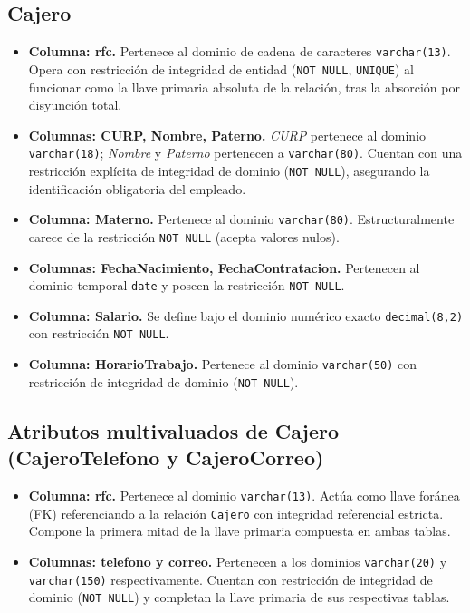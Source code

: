 \documentclass[11pt,letterpaper,spanish]{article}
\begin{document}
\subsection*{Cajero}
\begin{itemize}
	\item \textbf{Columna: rfc.} Pertenece al dominio de cadena de caracteres \texttt{varchar(13)}. Opera con restricción de integridad de entidad (\texttt{NOT NULL}, \texttt{UNIQUE}) al funcionar como la llave primaria absoluta de la relación, tras la absorción por disyunción total.
	\item \textbf{Columnas: CURP, Nombre, Paterno.} \textit{CURP} pertenece al dominio \texttt{varchar(18)}; \textit{Nombre} y \textit{Paterno} pertenecen a \texttt{varchar(80)}. Cuentan con una restricción explícita de integridad de dominio (\texttt{NOT NULL}), asegurando la identificación obligatoria del empleado.
	\item \textbf{Columna: Materno.} Pertenece al dominio \texttt{varchar(80)}. Estructuralmente carece de la restricción \texttt{NOT NULL} (acepta valores nulos).
	\item \textbf{Columnas: FechaNacimiento, FechaContratacion.} Pertenecen al dominio temporal \texttt{date} y poseen la restricción \texttt{NOT NULL}.
	\item \textbf{Columna: Salario.} Se define bajo el dominio numérico exacto \texttt{decimal(8,2)} con restricción \texttt{NOT NULL}.
	\item \textbf{Columna: HorarioTrabajo.} Pertenece al dominio \texttt{varchar(50)} con restricción de integridad de dominio (\texttt{NOT NULL}).
\end{itemize}

\subsection*{Atributos multivaluados de Cajero (CajeroTelefono y CajeroCorreo)}
\begin{itemize}
	\item \textbf{Columna: rfc.} Pertenece al dominio \texttt{varchar(13)}. Actúa como llave foránea (FK) referenciando a la relación \texttt{Cajero} con integridad referencial estricta. Compone la primera mitad de la llave primaria compuesta en ambas tablas.
	\item \textbf{Columnas: telefono y correo.} Pertenecen a los dominios \texttt{varchar(20)} y \texttt{varchar(150)} respectivamente. Cuentan con restricción de integridad de dominio (\texttt{NOT NULL}) y completan la llave primaria de sus respectivas tablas.
\end{itemize}
\end{document}
